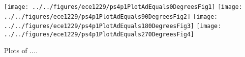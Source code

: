 \documentclass{scrreprt}
\newcommand{\onefigure}[2]{%
\texttt{[image: ../../figures/ece1229/\#2]}%
}
\newcommand{\fourfigures}[7]{%
\begin{center}%
\captionsetup{type=figure}%
\onefigure{scale=#1}{#2}%
\qquad%
\onefigure{scale=#1}{#3}%
\par\vspace{5mm}
\onefigure{scale=#1}{#4}%
\qquad%
\onefigure{scale=#1}{#5}%
\caption{#6}%
\label{#7}%
\end{center}%
}
\begin{document}
\begin{Exercise}



\begin{center}
\captionsetup{type=figure}
\texttt{[image: ../../figures/ece1229/ps4p1PlotAdEquals0DegreesFig1]}
\texttt{[image: ../../figures/ece1229/ps4p1PlotAdEquals90DegreesFig2]}
\texttt{[image: ../../figures/ece1229/ps4p1PlotAdEquals180DegreesFig3]}
\texttt{[image: ../../figures/ece1229/ps4p1PlotAdEquals270DegreesFig4]}
\caption{Plots of ....}
\label{fig:fourangles}
\end{center}

\end{Exercise}

\end{document}

